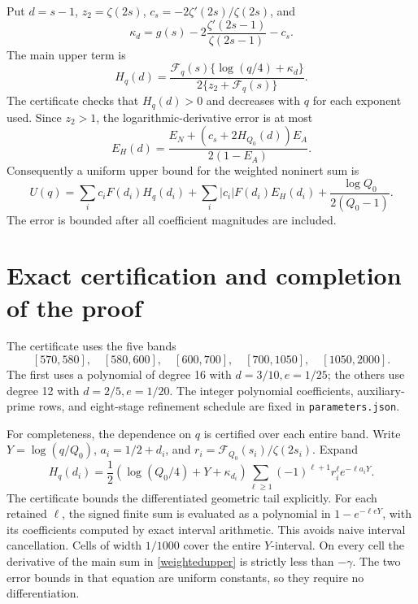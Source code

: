 \documentclass[11pt]{article}
\begin{document}
Put \(d=s-1\), \(z_2=\zeta(2s)\),
\(c_s=-2\zeta'(2s)/\zeta(2s)\), and
\[
 \kappa_d=g(s)-2\frac{\zeta'(2s-1)}{\zeta(2s-1)}-c_s.
\]
The main upper term is
\begin{equation}\label{Hmain}
 H_q(d)=\frac{\mathcal F_q(s)\{\log(q/4)+\kappa_d\}}
                   {2\{z_2+\mathcal F_q(s)\}}.
\end{equation}
The certificate checks that \(H_q(d)>0\) and decreases with \(q\)
for each exponent used. Since \(z_2>1\), the logarithmic-derivative
error is at most
\begin{equation}\label{Herror}
 E_H(d)=\frac{E_N+(c_s+2H_{Q_0}(d))E_A}{2(1-E_A)}.
\end{equation}
Consequently a uniform upper bound for the weighted noninert sum is
\begin{equation}\label{weightedupper}
 U(q)=\sum_i c_iF(d_i)H_q(d_i)
       +\sum_i|c_i|F(d_i)E_H(d_i)
       +\frac{\log Q_0}{2(Q_0-1)}.
\end{equation}
The error is bounded after all coefficient magnitudes are included.

\section{Exact certification and completion of the proof}\label{certificate}
The certificate uses the five bands
\[
 [570,580],\quad[580,600],\quad[600,700],\quad[700,1050],\quad[1050,2000].
\]
The first uses a polynomial of degree 16 with \(d=3/10,e=1/25\);
the others use degree 12 with \(d=2/5,e=1/20\). The integer
polynomial coefficients, auxiliary-prime rows, and eight-stage
refinement schedule are fixed in \texttt{parameters.json}.

For completeness, the dependence on \(q\) is certified over each
entire band. Write \(Y=\log(q/Q_0)\),
\(a_i=1/2+d_i\), and
\(r_i=\mathcal F_{Q_0}(s_i)/\zeta(2s_i)\). Expand
\[
 H_q(d_i)=\frac12(\log(Q_0/4)+Y+\kappa_{d_i})
       \sum_{\ell\ge1}(-1)^{\ell+1}r_i^\ell e^{-\ell a_iY}.
\]
The certificate bounds the differentiated geometric tail explicitly.
For each retained \(\ell\), the signed finite sum is evaluated as
a polynomial in \(1-e^{-\ell eY}\), with its coefficients computed
by exact interval arithmetic. This avoids naive interval cancellation.
Cells of width \(1/1000\) cover the entire \(Y\)-interval. On every
cell the derivative of the main sum in \eqref{weightedupper} is
strictly less than \(-\gamma\). The two error bounds in that equation
are uniform constants, so they require no differentiation.
\end{document}
